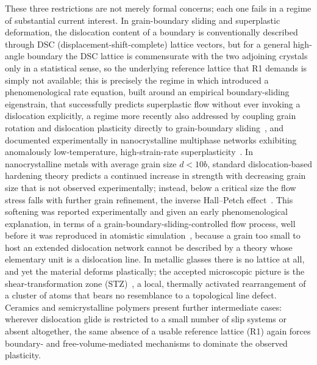 \documentclass[3p]{elsarticle}
\begin{document}
These three restrictions are not merely formal concerns; each one
fails in a regime of substantial current interest. In grain-boundary
sliding and superplastic deformation, the dislocation content of a
boundary is conventionally described through DSC
(displacement-shift-complete) lattice vectors, but for a general
high-angle boundary the DSC lattice is commensurate with the two
adjoining crystals only in a statistical sense, so the underlying
reference lattice that R1 demands is simply not available; this is
precisely the regime in which
\citet{pad-part1,padgleiter2014,paddivinski2024} introduced a
phenomenological rate equation, built around an empirical
boundary-sliding eigenstrain, that successfully predicts superplastic
flow without ever invoking a dislocation explicitly, a regime more
recently also addressed by coupling grain rotation and dislocation
plasticity directly to grain-boundary
sliding~\citep{borodin2020coupled,huang2022sliding,hua2022sliding,huang2024triple,du2025superplastic}, and
documented experimentally in nanocrystalline multiphase networks exhibiting
anomalously low-temperature, high-strain-rate
superplasticity~\citep{wang2023superplast,zhang2023heanano}. In nanocrystalline
metals with average grain size $d<10b$, standard dislocation-based hardening
theory predicts a continued increase in strength with decreasing grain
size that is not observed experimentally; instead, below a critical
size the flow stress falls with further grain refinement, the inverse
Hall--Petch effect~\citep{ovidko2017triple,li2024hpihp,han2022nchp,li2024ita,ma2024nanocrystalline,cappola2024nc}. This softening was reported experimentally and
given an early phenomenological explanation, in terms of a
grain-boundary-sliding-controlled flow process, well before it was
reproduced in atomistic
simulation~\citep{hahnpadmanabhan1997,schiotz1998}, because a grain too small to
host an extended dislocation network cannot be described by a theory
whose elementary unit is a dislocation line. In metallic glasses there
is no lattice at all, and yet the material deforms plastically; the
accepted microscopic picture is the shear-transformation zone
(STZ)~\citep{argon1979,falk-langer1998,zhu2024stz}, a local, thermally activated
rearrangement of a cluster of atoms that bears no resemblance to a
topological line defect. Ceramics and semicrystalline polymers present
further intermediate cases: wherever dislocation glide is restricted
to a small number of slip systems or absent altogether, the same
absence of a usable reference lattice (R1) again forces boundary- and
free-volume-mediated mechanisms to dominate the observed plasticity.
\end{document}
